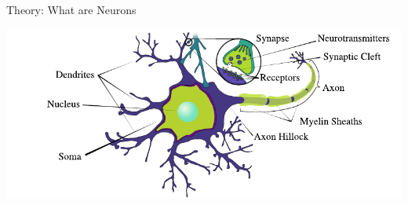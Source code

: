 \documentclass[aspectratio=169]{beamer}
\begin{document}
\begin{frame}{Theory: What are Neurons}
    \begin{center}
        \includegraphics[width=\textwidth]{images/neuron_structure.pdf}
    \end{center}
\end{frame}
\end{document}
